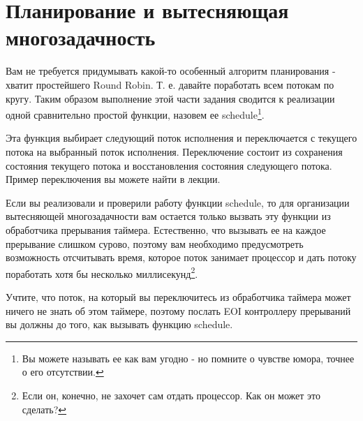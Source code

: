 \section{Планирование и вытесняющая многозадачность}

Вам не требуется придумывать какой-то особенный алгоритм планирования - хватит
простейшего Round Robin. Т. е. давайте поработать всем потокам по кругу. Таким
образом выполнение этой части задания сводится к реализации одной сравнительно
простой функции, назовем ее schedule\footnote{Вы можете называть ее как вам
угодно - но помните о чувстве юмора, точнее о его отсутствии.}.

Эта функция выбирает следующий поток исполнения и переключается с текущего
потока на выбранный поток исполнения. Переключение состоит из сохранения
состояния текущего потока и восстановления состояния следующего потока. Пример
переключения вы можете найти в лекции.

Если вы реализовали и проверили работу функции schedule, то для организации
вытесняющей многозадачности вам остается только вызвать эту функции из
обработчика прерывания таймера. Естественно, что вызывать ее на каждое
прерывание слишком сурово, поэтому вам необходимо предусмотреть возможность
отсчитывать время, которое поток занимает процессор и дать потоку поработать
хотя бы несколько миллисекунд\footnote{Если он, конечно, не захочет сам отдать
процессор. Как он может это сделать?}.

Учтите, что поток, на который вы переключитесь из обработчика таймера может
ничего не знать об этом таймере, поэтому послать EOI контроллеру прерываний вы
должны до того, как вызывать функцию schedule.

